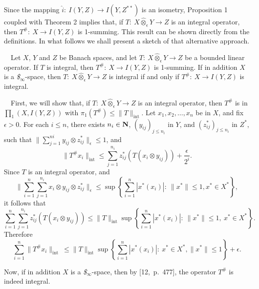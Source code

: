 Since the mapping $\hat i:\ I(Y,Z)\longrightarrow I(Y,Z^{**})$ is an
isometry, Proposition 1 coupled with Theorem 2 implies that, if $T:\
X\hat\otimes_\epsilon Y\longrightarrow Z$ is an integral operator, 
then
$T^\#:\ X\longrightarrow I(Y,Z)$ is 1-summing.  This result can be 
shown
directly from the definitions.  In what follows we shall present a 
sketch of
that alternative approach. 

\medskip

\ \ Let $X$, $Y$ and $Z$ be Banach spaces, 
and let
$T:\ X\hat \otimes_\epsilon Y\longrightarrow Z$ be a bounded linear
operator.  If $T$ is integral, then $T^\#:\ X\longrightarrow I(Y,Z)$ 
is
1-summing.  If in addition $X$ is a {\it \$}$_\infty$-space, then $T:\
X\hat \otimes_\epsilon Y\longrightarrow Z$ is integral if and only if
$T^\#:\ X\longrightarrow I(Y,Z)$ is integral.

\medskip
{}\ \ First, we will show that, if $T:\ X\hat
\otimes_\epsilon Y\longrightarrow Z$ is an integral operator, then 
$T^\#$ is in
$\prod_1\left(X,I(Y,Z)\right)$ with $\pi_1(T^\#)\leq \parallel 
T\parallel_{\text
{int}}$.   Let $x_1, x_2,\ldots, x_n$ be in
$X$, and fix
$\epsilon>0$.  For each $i\leq n$, there exists $n_i\in \Bbb N$,
$\left(y_{ij}\right)_{j\leq n_i}$ in $Y$, and $(z^*_{ij})_{j\leq n_i}$ 
in
$Z^*$, such that $\parallel \sum\limits^{ni}_{j=1}y_{ij}\otimes
z^*_{ij}\parallel_\epsilon \leq 1$, and
$$
\parallel T^\#x_i\parallel_{\text {int}}\leq
\sum\limits^{n_i}_{j=1}z^*_{ij}\left(T(x_i\otimes
y_{ij})\right)+\dfrac \epsilon {2^i}.
$$
Since $T$ is an integral operator, and
$$
\parallel \sum\limits^n_{i=1}\sum\limits^{n_i}_{j=1}x_i\otimes
y_{ij}\otimes z^*_{ij}\parallel_\epsilon \leq \sup
\left\{\sum\limits^n_{i=1}|x^*(x_i)|:\ \parallel x^*\parallel \leq 1,
x^*\in X^*\right\},
$$
it follows that
$$
\sum\limits^n_{i=1}\sum\limits^{n_i}_{j=1} z^*_{ij}
\left(T(x_i\otimes y_{ij})\right)\leq
\parallel T\parallel_{\text {int
}}\sup\left\{\sum\limits^n_{i=1}|x^*(x_i)|:\ \parallel x^*\parallel 
\leq
1,\ x^*\in X^*\right\}.
$$
Therefore
$$
\sum\limits^n_{i=1}\parallel T^\#x_i\parallel_{\text {int }}\leq
\parallel T\parallel_{\text {int
}}\sup\left\{\sum\limits^n_{i=1}|x^*(x_i)|:\ x^*\in X^*, \parallel
x^*\parallel \leq 1\right\}+ \epsilon.
$$

\medskip

Now, if in addition
$X$ is a {\it \$}$_\infty$-space, then by [12,~p.~477], the
operator $T^\#$ is indeed integral.
\endproof

\medskip

